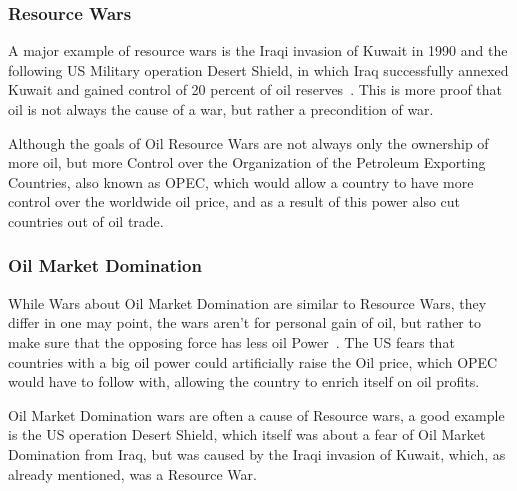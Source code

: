 \subsubsection{Resource Wars}
A major example of resource wars is the Iraqi invasion of Kuwait in 1990 and the following US Military operation Desert Shield, in which Iraq successfully annexed Kuwait and gained control of 20 percent of oil reserves~\autocite{history-iraq-kuwait}. This is more proof that oil is not always the cause of a war, but rather a precondition of war.

Although the goals of Oil Resource Wars are not always only the ownership of more oil, but more Control over the Organization of the Petroleum Exporting Countries, also known as OPEC, which would allow a country to have more control over the worldwide oil price, and as a result of this power also cut countries out of oil trade.

\subsubsection{Oil Market Domination}
While Wars about Oil Market Domination are similar to Resource Wars, they differ in one may point, the wars aren't for personal gain of oil, but rather to make sure that the opposing force has less oil Power~\autocite{fueling-fire-jeff-d}. The US fears that countries with a big oil power could artificially raise the Oil price, which OPEC would have to follow with, allowing the country to enrich itself on oil profits.

Oil Market Domination wars are often a cause of Resource wars, a good example is the US operation Desert Shield, which itself was about a fear of Oil Market Domination from Iraq, but was caused by the Iraqi invasion of Kuwait, which, as already mentioned, was a Resource War.